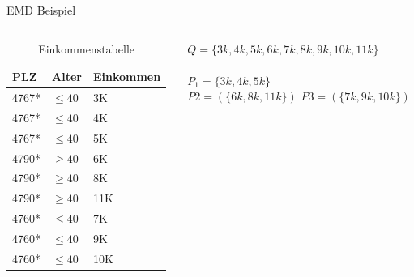 \begin{frame} {EMD Beispiel}
	
	\begin{columns}[T]
		\begin{column}{0.5\textwidth}
			\begin{table}[]
				\centering
				\label{tclossenessExample}
				\begin{tabular}{|l|l|l|}
					\hline
					\textbf{PLZ}   & \textbf{Alter}    & \textbf{Einkommen} \\\hline
					4767* & $\le 40$ & 3K \\
					4767* & $\le 40$ & 4K \\
					4767* & $\le 40$ & 5K \\\hline
					4790* & $\ge 40$ & 6K \\
					4790* & $\ge 40$ & 8K \\
					4790* & $\ge 40$ & 11K \\\hline
					4760* & $\le 40$ & 7K \\
					4760* & $\le 40$ & 9K \\
					4760* & $\le 40$ & 10K \\\hline
				\end{tabular}
				\caption{Einkommenstabelle}
			\end{table}
		\end{column}
		
		\begin{column}{0.5\textwidth}
			$Q = \{3k, 4k, 5k, 6k, 7k, 8k, 9k, 10k, 11k\}$\\
			\ \\
			$P_1 = \{3k, 4k, 5k\}$ \\
			$P2 = (\{6k, 8k, 11k\})$ 
			$P3 = (\{7k, 9k, 10k\})$
			
		\end{column}
	\end{columns}
\end{frame}
